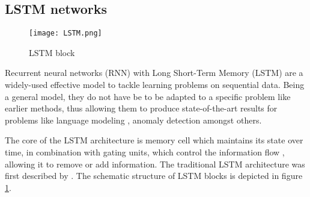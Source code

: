 \begin{comment}
Figure \ref{fig:simple_neural_network} shows a simple neural network with three input features $v_1, v_2, v_3$. The output neuron is composed of the forward propagation function given by the weighted sums of neuron values, where the weights are $w_i$, and the activation function given by $h$. There exists a large variety of activation functions in use, depending on the given use case. The learning process of a neural network consists of learning the weights

Training of a neural network happens through 
Training of a neural network can be done in an \textit{unsupervised} and \textit{supervised} manner. Supervised training of 
The complexity of neural networks can be increased by adding more neurons and additional layers, making it possible to process larger input and potentially receive better results in prediction. The concept of the traditional feedforward neural networks is subject to constant architectural enhancement. 

Through the surge of available cheap computing power, deep learning models with high numbers of layers of neurons can be trained on large amounts of data. Also, the concept of the traditional neural network is constantly being 
\end{comment}



\subsection{LSTM networks \label{sec:lstm}}
\begin{figure}[h]
  \centering
  \texttt{[image: LSTM.png]}\\
  \caption{LSTM block \cite{graves2013speech}}
  \label{fig:lstm_blocks}
\end{figure}


Recurrent neural networks (RNN) with Long Short-Term Memory (LSTM) are a widely-used effective model to tackle learning problems on sequential data. Being a general model, they do not have be to be adapted to a specific problem like earlier methods, thus allowing them to produce state-of-the-art results for problems like language modeling \cite{peters2018deep}, anomaly detection \cite{du2017deeplog} amongst others.

The core of the LSTM architecture is memory cell which maintains its state over time, in combination with gating units, which control the information flow \cite{greff2016lstm}, allowing it to remove or add information. The traditional LSTM architecture was first described by \cite{graves2005framewise}. The schematic structure of LSTM blocks is depicted in figure \ref{fig:lstm_blocks}. 

